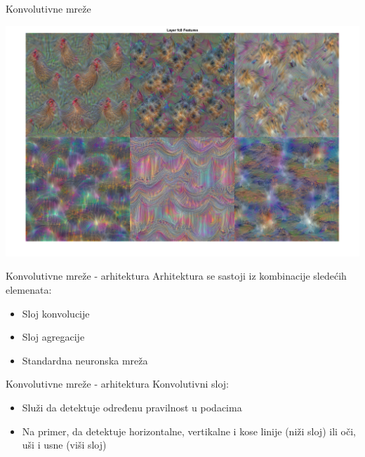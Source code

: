 \documentclass{beamer}
\begin{document}
\begin{frame}{Konvolutivne mreže}
    \begin{center}
        \includegraphics[width=\textwidth]{./slike/covnet-visual02.png}
    \end{center}
\end{frame}
\begin{frame}{Konvolutivne mreže - arhitektura}
    Arhitektura se sastoji iz kombinacije sledećih elemenata:
    \begin{itemize}
        \item Sloj konvolucije
        \item Sloj agregacije
        \item Standardna neuronska mreža
    \end{itemize}
\end{frame}
\begin{frame}{Konvolutivne mreže - arhitektura}
    Konvolutivni sloj:
    \begin{itemize}
        \item Služi da detektuje određenu pravilnost u podacima
        \item Na primer, da detektuje horizontalne, vertikalne i kose linije (niži sloj) ili oči, uši i usne (viši sloj)
    \end{itemize}
\end{frame}
\end{document}
